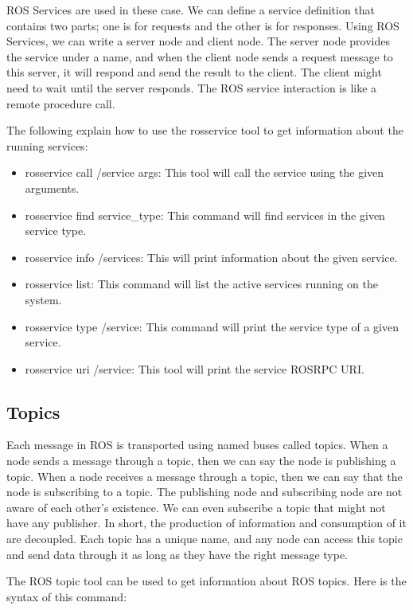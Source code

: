  	ROS Services are used in these case. We can define a service definition that contains two parts; one is for requests and the other is for responses. 
 	Using ROS Services, we can write a server node and client node. The server node provides the service under a name, and when the client node sends a request message to this server, it will respond and send the result to the client. The client might need to wait until the server responds. The ROS service interaction is like a remote procedure call.
 	
 	The following explain how to use the rosservice tool to get information about the running services:
 	
 	\begin{itemize}
 		\item rosservice call /service args: This tool will call the service using the given arguments.
 		\item rosservice find service\_type: This command will find services in the given service type.
 		\item rosservice info /services: This will print information about the given service.
 		\item rosservice list: This command will list the active services running on the system.
 		\item rosservice type /service: This command will print the service type of a given service.
 		\item rosservice uri /service: This tool will print the service ROSRPC URI.
 	\end{itemize}
 
 	\subsection{Topics}
 	Each message in ROS is transported using named buses called topics. When a node sends a message through a topic, then we can say the node is publishing a topic. When a node receives a message through a topic, then we can say that the node is subscribing to a topic. The publishing node and subscribing node are not aware of each other's existence. We can even subscribe a topic that might not have any publisher. In short, the production of information and consumption of it are decoupled. Each topic has a unique name, and any node can access this topic and send data through it as long as they have the right message type.
 	
 	The ROS topic tool can be used to get information about ROS topics. Here is the syntax of this command:
 	
